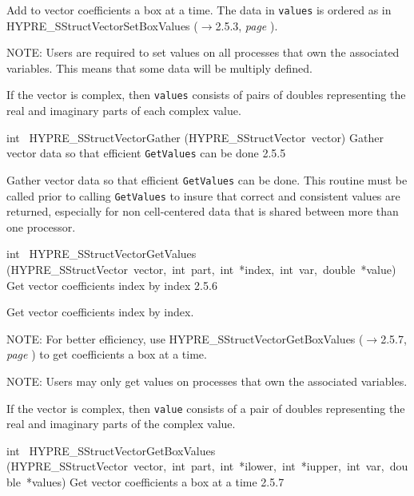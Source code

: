 \documentclass{article}
\begin{document}
\begin{cxxentry}
\begin{cxxentry}
\begin{cxxfunction}
\begin{cxxdoc}
Add to vector coefficients a box at a time.  The data in {\tt values} is
ordered as in HYPRE\_SStructVectorSetBoxValues ($\rightarrow$2.5.3, {\em page \pageref{cxx.2.5.3}}).

NOTE: Users are required to set values on all processes that own the
associated variables.  This means that some data will be multiply defined.

If the vector is complex, then {\tt values} consists of pairs of doubles
representing the real and imaginary parts of each complex value.


\end{cxxdoc}
\end{cxxfunction}
\begin{cxxfunction}
{int\ }
        {HYPRE\_SStructVectorGather}
        {(HYPRE\_SStructVector\ vector)}
        {
Gather vector data so that efficient {\tt GetValues} can be done}
        {2.5.5}
\begin{cxxdoc}

Gather vector data so that efficient {\tt GetValues} can be done.  This
routine must be called prior to calling {\tt GetValues} to insure that
correct and consistent values are returned, especially for non cell-centered
data that is shared between more than one processor.
\end{cxxdoc}
\end{cxxfunction}
\begin{cxxfunction}
{int\ }
        {HYPRE\_SStructVectorGetValues}
        {(HYPRE\_SStructVector\ vector,\ int\ part,\ int\ *index,\ int\ var,\ double\ *value)}
        {
Get vector coefficients index by index}
        {2.5.6}
\begin{cxxdoc}

Get vector coefficients index by index.

NOTE: For better efficiency, use HYPRE\_SStructVectorGetBoxValues ($\rightarrow$2.5.7, {\em page \pageref{cxx.2.5.7}}) to get
coefficients a box at a time.

NOTE: Users may only get values on processes that own the associated
variables.

If the vector is complex, then {\tt value} consists of a pair of doubles
representing the real and imaginary parts of the complex value.


\end{cxxdoc}
\end{cxxfunction}
\begin{cxxfunction}
{int\ }
        {HYPRE\_SStructVectorGetBoxValues}
        {(HYPRE\_SStructVector\ vector,\ int\ part,\ int\ *ilower,\ int\ *iupper,\ int\ var,\ double\ *values)}
        {
Get vector coefficients a box at a time}
        {2.5.7}
\begin{cxxdoc}


\end{cxxdoc}
\end{cxxfunction}
\end{cxxentry}
\end{cxxentry}
\end{document}
